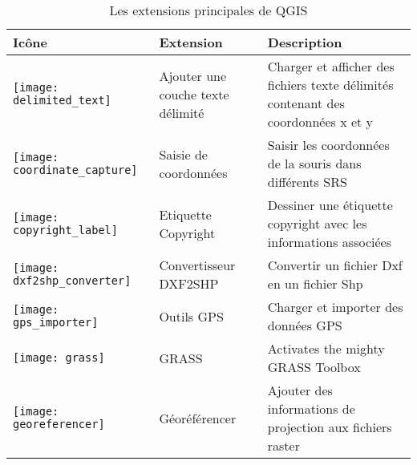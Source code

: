 
\begin{minipage}{\textwidth}
\begin{table}[H]
\centering
\caption{Les extensions principales de QGIS}\label{tab:core_plugins}\medskip
\small
 \begin{tabular}{|l|l|p{4in}|}
\hline \textbf{Ic\^one} & \textbf{Extension} & \textbf{Description}\\
\hline
\texttt{[image: delimited\_text]}
 & Ajouter une couche texte d\'elimit\'e \index{extensions!texte delimite} & Charger et afficher des fichiers texte d\'elimit\'es contenant des coordonn\'ees x et y\\
\hline
\texttt{[image: coordinate\_capture]}
 & Saisie de coordonn\'ees \index{extensions!saisie de coordonnees} & Saisir les coordonn\'ees de la souris dans diff\'erents SRS\\
\hline 
\texttt{[image: copyright\_label]}
 & Etiquette Copyright \index{extensions!copyright} & Dessiner une \'etiquette copyright avec les informations associ\'ees\\
\hline 
\texttt{[image: dxf2shp\_converter]}
 & Convertisseur DXF2SHP \index{extensions!DXF2Shape} & Convertir un fichier Dxf en un fichier Shp\\
\hline
\texttt{[image: gps\_importer]}
 & Outils GPS \index{extensions!gps} & Charger et importer des donn\'ees GPS\\
\hline
\texttt{[image: grass]}
 & GRASS \index{extensions!boite a outils grass} & Activates the mighty GRASS Toolbox\\
\hline
\texttt{[image: georeferencer]}
 & G\'eor\'ef\'erencer \index{extensions!georeferencer} & Ajouter des informations de projection aux fichiers raster\\

\end{tabular}
\end{table}
\end{minipage}
